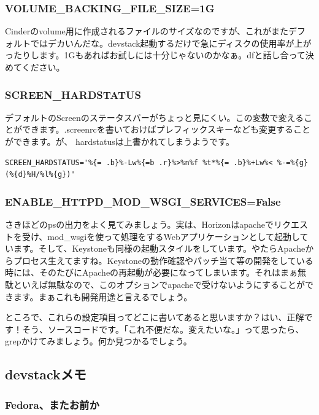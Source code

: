 \documentclass[9pt,b5paper,tombo,openany]{jsbook}
\begin{document}
\subsubsection{VOLUME\_BACKING\_FILE\_SIZE=1G}

Cinderのvolume用に作成されるファイルのサイズなのですが、これがまたデフォルトではデカいんだな。devstack起動するだけで急にディスクの使用率が上がったりします。1Gもあればお試しには十分じゃないのかなぁ。dfと話し合って決めてください。

\subsubsection{SCREEN\_HARDSTATUS}

デフォルトのScreenのステータスバーがちょっと見にくい。この変数で変えることができます。.screenrcを書いておけばプレフィックスキーなども変更することができます。が、 hardstatusは上書かれてしまうようです。

\begin{lstlisting}
SCREEN_HARDSTATUS='%{= .b}%-Lw%{=b .r}%>%n%f %t*%{= .b}%+Lw%< %-=%{g}(%{d}%H/%l%{g})'
\end{lstlisting}

\subsubsection{ENABLE\_HTTPD\_MOD\_WSGI\_SERVICES=False}

さきほどのpsの出力をよく見てみましょう。実は、Horizonはapacheでリクエストを受け、mod\_wsgiを使って処理をするWebアプリケーションとして起動しています。そして、Keystoneも同様の起動スタイルをしています。やたらApacheからプロセス生えてますね。Keystoneの動作確認やパッチ当て等の開発をしている時には、そのたびにApacheの再起動が必要になってしまいます。それはまぁ無駄といえば無駄なので、このオプションでapacheで受けないようにすることができます。まぁこれも開発用途と言えるでしょう。

ところで、これらの設定項目ってどこに書いてあると思いますか？はい、正解です！そう、ソースコードです。「これ不便だな。変えたいな。」って思ったら、grepかけてみましょう。何か見つかるでしょう。

\subsection{devstackメモ}

\subsubsection{Fedora、またお前か}
\end{document}

